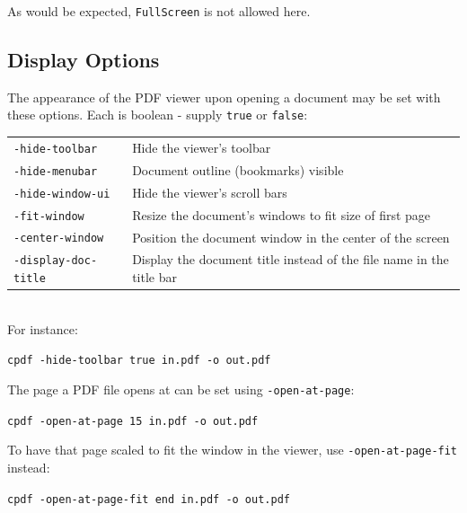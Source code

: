 \documentclass{book}
\begin{document}
  \noindent As would be expected, \texttt{FullScreen} is not allowed here.
  
  \subsection{Display Options}

The appearance of the PDF viewer upon opening a document may be set with these options. Each is boolean - supply \texttt{true} or \texttt{false}:

\vspace{2mm}
  {\small\begin{tabular}{ll}
    \texttt{-hide-toolbar} & \vspace{2mm} \parbox{8cm}{Hide the viewer's toolbar} \\
    \texttt{-hide-menubar} & \vspace{2mm} \parbox{8cm}{Document outline (bookmarks) visible} \\
    \texttt{-hide-window-ui} & \vspace{2mm} \parbox{8cm}{Hide the viewer's scroll bars} \\
    \texttt{-fit-window} & \vspace{2mm} \parbox{8cm}{Resize the document's windows to fit size of first page} \\
    \texttt{-center-window} & \vspace{2mm} \parbox{8cm}{Position the document window in the center of the screen} \\
    \texttt{-display-doc-title} & \vspace{2mm} \parbox{8cm}{Display the document title instead of the file name in the title bar}
  \end{tabular}}\\

  \noindent For instance:
  \begin{framed}
    \noindent\small\verb!cpdf -hide-toolbar true in.pdf -o out.pdf!
  \end{framed}

\noindent The page a PDF file opens at can be set using \texttt{-open-at-page}:
  \begin{framed}
    \noindent\small\verb!cpdf -open-at-page 15 in.pdf -o out.pdf!
  \end{framed}

\noindent To have that page scaled to fit the window in the viewer, use \texttt{-open-at-page-fit} instead:
  \begin{framed}
    \noindent\small\verb!cpdf -open-at-page-fit end in.pdf -o out.pdf!
  \end{framed}
\end{document}
